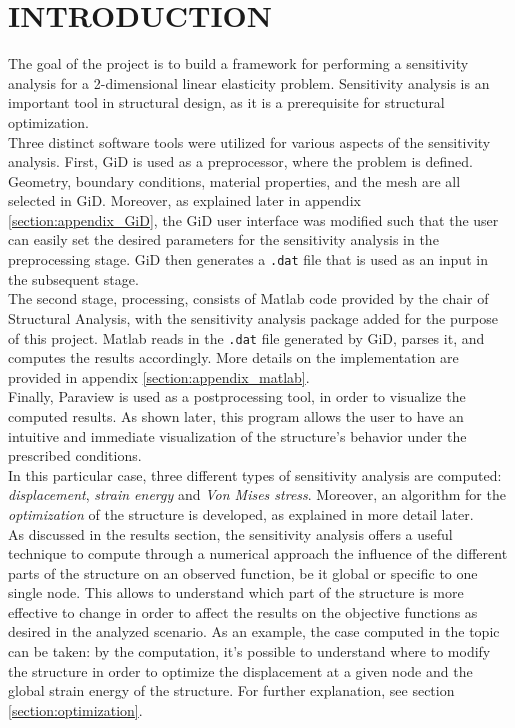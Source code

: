 
\section{INTRODUCTION}
The goal of the project is to build a framework for performing a sensitivity analysis for a 2-dimensional linear elasticity problem. Sensitivity analysis is an important tool in structural design, as it is a prerequisite for structural optimization.
\\[6pt]
Three distinct software tools were utilized for various aspects of the sensitivity analysis. First, GiD is used as a preprocessor, where the problem is defined. Geometry, boundary conditions, material properties, and the mesh are all selected in GiD. Moreover, as explained later in appendix \ref{section:appendix_GiD}, the GiD user interface was modified such that the user can easily set the desired parameters for the sensitivity analysis in the preprocessing stage. GiD then generates a \texttt{.dat} file that is used as an input in the subsequent stage.%
\\[6pt]
The second stage, processing, consists of Matlab code provided by the chair of Structural Analysis, with the sensitivity analysis package added for the purpose of this project. Matlab reads in the \texttt{.dat} file generated by GiD, parses it, and computes the results accordingly. More details on the implementation are provided in appendix \ref{section:appendix_matlab}. \\[6pt]
Finally, Paraview is used as a postprocessing tool, in order to visualize the computed results. As shown later, this program allows the user to have an intuitive and immediate visualization of the structure's behavior under the prescribed conditions.\\[6pt]
In this particular case, three different types of sensitivity analysis are computed: \textit{displacement}, \textit{strain energy} and \textit{Von Mises stress}.  Moreover, an algorithm for the \textit{optimization} of the structure is developed, as explained in more detail later.\\[6pt]
As discussed in the results section, the sensitivity analysis offers a useful technique to compute through a numerical approach the influence of the different parts of the structure on an observed function, be it global or specific to one single node. This allows to understand which part of the structure is more effective to change in order to affect the results on the objective functions as desired in the analyzed scenario. As an example, the case computed in the topic can be taken: by the computation, it's possible to understand where to modify the structure in order to optimize the displacement at a given node and the global strain energy of the structure. For further explanation, see section \ref{section:optimization}.
\\[6pt]
